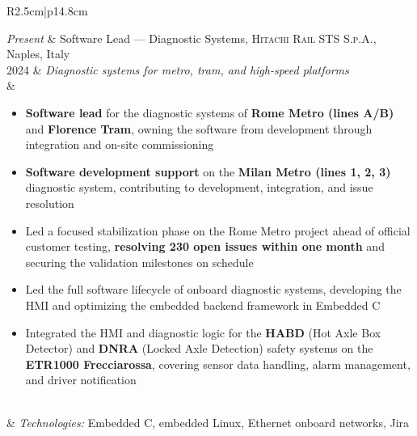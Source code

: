 
\begin{longtable}{R{2.5cm}|p{14.8cm}}

	\emph{Present} & Software Lead --- Diagnostic Systems, \textsc{Hitachi Rail STS S.p.A.}, Naples, Italy\\
	\textsc{2024}  & \emph{Diagnostic systems for metro, tram, and high-speed platforms}\\&
	\footnotesize{
		\begin{itemize}
			\item \textbf{Software lead} for the diagnostic systems of \textbf{Rome Metro (lines A/B)} and \textbf{Florence Tram}, owning the software from development through integration and on-site commissioning
			\item \textbf{Software development support} on the \textbf{Milan Metro (lines 1, 2, 3)} diagnostic system, contributing to development, integration, and issue resolution
			\item Led a focused stabilization phase on the Rome Metro project ahead of official customer testing, \textbf{resolving 230 open issues within one month} and securing the validation milestones on schedule
			\item Led the full software lifecycle of onboard diagnostic systems, developing the HMI and optimizing the embedded backend framework in Embedded C
			\item Integrated the HMI and diagnostic logic for the \textbf{HABD} (Hot Axle Box Detector) and \textbf{DNRA} (Locked Axle Detection) safety systems on the \textbf{ETR1000 Frecciarossa}, covering sensor data handling, alarm management, and driver notification
		\end{itemize}
		\vspace{-1em}
	}\\&
	\footnotesize{\emph{Technologies:} Embedded C, embedded Linux, Ethernet onboard networks, Jira}\\
\\


\end{longtable}

